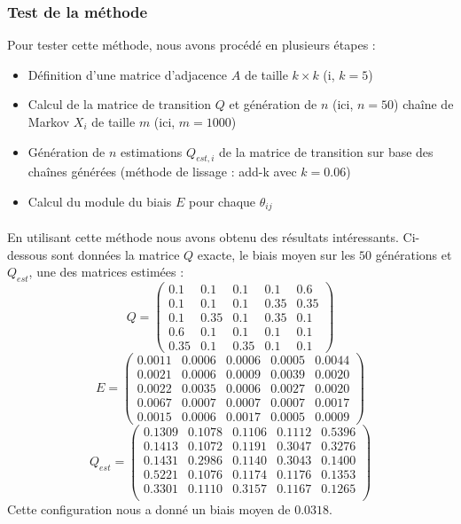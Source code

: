 \documentclass[a4paper,titlepage]{report}
\begin{document}
\subsubsection{Test de la méthode}
Pour tester cette méthode, nous avons procédé en plusieurs étapes : 
\begin{itemize}
	\item Définition d'une matrice d'adjacence $A$ de taille $k \times k$ (i, $k = 5$)
	\item Calcul de la matrice de transition $Q$ et génération de $n$ (ici, $n = 50$) chaîne de Markov $X_i$ de taille $m$ (ici, $m = 1000$)
	\item Génération de $n$ estimations $Q_{est,i}$ de la matrice de transition sur base des chaînes générées (méthode de lissage : add-k avec $k = 0.06$)
	\item Calcul du module du biais $E$ pour chaque $\theta_{ij}$ 
\end{itemize}
\paragraph{}
En utilisant cette méthode nous avons obtenu des résultats intéressants. Ci-dessous sont données la matrice $Q$ exacte, le biais moyen sur les $50$ générations et $Q_{est}$, une des matrices estimées :
\[
Q = 
\begin{pmatrix}
 0.1 & 0.1 & 0.1 & 0.1 & 0.6\\
 0.1 & 0.1 & 0.1 & 0.35 & 0.35\\
 0.1 & 0.35 & 0.1 & 0.35 & 0.1\\
 0.6 & 0.1 & 0.1 & 0.1 & 0.1\\
 0.35 & 0.1 & 0.35 & 0.1 & 0.1 
\end{pmatrix}
\]
\[
E = 
\begin{pmatrix}
0.0011 & 0.0006 & 0.0006 & 0.0005 & 0.0044\\
0.0021 & 0.0006 & 0.0009 & 0.0039 & 0.0020\\
0.0022 & 0.0035 & 0.0006 & 0.0027 & 0.0020\\
0.0067 & 0.0007 & 0.0007 & 0.0007 & 0.0017\\
0.0015 & 0.0006 & 0.0017 & 0.0005 & 0.0009 
\end{pmatrix}
\]
\[
Q_{est} = 
\begin{pmatrix}
0.1309 & 0.1078 & 0.1106 & 0.1112 & 0.5396\\
0.1413 & 0.1072 & 0.1191 & 0.3047 & 0.3276\\
0.1431 & 0.2986 & 0.1140 & 0.3043 & 0.1400\\
0.5221 & 0.1076 & 0.1174 & 0.1176 & 0.1353\\
0.3301 & 0.1110 & 0.3157 & 0.1167 & 0.1265\\
\end{pmatrix}
\]
Cette configuration nous a donné un biais moyen de $0.0318$.
\end{document}
